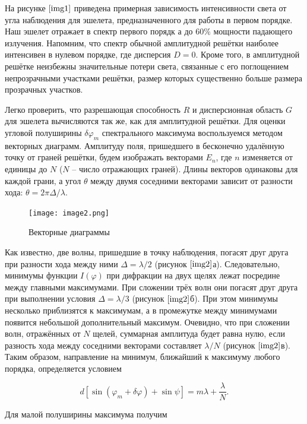 \documentclass[a4paper,12pt]{article} %
\begin{document}
На рисунке $\ref{img1}$ приведена примерная зависимость интенсивности света от угла наблюдения для эшелета, предназначенного для работы в первом порядке. Наш эшелет отражает в спектр первого порядк а до $60\%$ мощности падающего излучения. Напомним, что спектр обычной амплитудной решётки наиболее интенсивен в нулевом порядке, где дисперсия $D=0$. Кроме того, в амплитудной решётке неизбежны значительные потери света, связанные с его поглощением непрозрачными участками решётки, размер которых существенно больше размера прозрачных участков.

Легко проверить, что разрешающая способность $R$ и дисперсионная область $G$ для эшелета вычисляются так же, как для амплитудной решётки. Для оценки угловой полуширины $\delta\varphi_{m}$ спектрального максимума воспользуемся методом векторных диаграмм. Амплитуду поля, пришедшего в бесконечно удалённую точку от граней решётки, будем изображать векторами $E_{n}$, где $n$ изменяется от единицы до $N$ ($N$ -- число отражающих граней). Длины векторов одинаковы для каждой грани, а угол $\theta$ между двумя соседними векторами зависит от разности хода: $\theta=2\pi\Delta/\lambda$.

\begin{figure}[h]
    \begin{center}
        \texttt{[image: image2.png]}
    \end{center}
    \caption{Векторные диаграммы}
    \label{img2}
\end{figure}

Как известно, две волны, пришедшие в точку наблюдения, погасят друг друга при разности хода между ними $\Delta=\lambda/2$ (рисунок $\ref{img2}$а). Следовательно, минимумы функции $I(\varphi)$ при дифракции на двух щелях лежат посредине между главными максимумами. При сложении трёх волн они погасят друг друга при выполнении условия $\Delta=\lambda/3$ (рисунок $\ref{img2}$б). При этом минимумы несколько приблизятся к максимумам, а в промежутке между минимумами появится небольшой дополнительный максимум. Очевидно, что при сложении волн, отражённых от $N$ щелей, суммарная амплитуда будет равна нулю, если разность хода между соседними векторами составляет $\lambda/N$ (рисунок $\ref{img2}$в). Таким образом, направление на минимум, ближайший к максимуму любого порядка, определяется условием

\[ d[\sin{(\varphi_m+\delta\varphi)}+\sin{\psi}]=m\lambda+\frac{\lambda}{N}. \]

Для малой полуширины максимума получим
\end{document}
